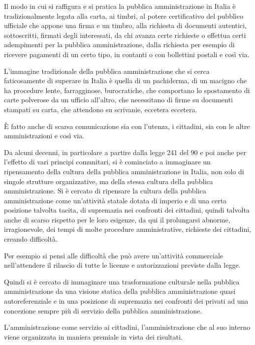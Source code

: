 Il modo in cui si raffigura e si pratica la pubblica amministrazione in Italia è tradizionalmente legata alla carta, ai timbri, al potere certificativo del pubblico ufficiale che appone una firma e un timbro, alla richiesta di documenti autentici, sottoscritti, firmati degli interessati, da chi avanza certe richieste o effettua certi adempimenti per la pubblica amministrazione, dalla richiesta per esempio di ricevere pagamenti di un certo tipo, in contanti o con bollettini postali e così via.\par
L'immagine tradizionale della pubblica amministrazione che si cerca faticosamente di superare in Italia  è quella di un pachiderma, di un macigno che ha procedure lente, farragginose, burocratiche, che comportano lo spostamento di carte polverose da un ufficio all'altro, che necessitano di firme su documenti stampati su carta, che attendono su scrivanie, eccetera eccetera.\par
È fatto anche di scarsa comunicazione sia con l'utenza, i cittadini, sia con le altre amministrazioni e così via.\par
Da alcuni decenni, in particolare a partire dalla legge 241 del 90 e poi anche per l'effetto di vari principi comunitari, si è cominciato a immaginare un ripensamento della cultura della pubblica amministrazione in Italia, non solo di singole strutture organizzative, ma della stessa cultura della pubblica amministrazione. Si è cercato di ripensare la cultura della pubblica amministrazione come un'attività statale dotata di imperio e di una certa posizione talvolta tacita, di supremazia nei confronti dei cittadini, quindi talvolta anche di scarso rispetto per le loro esigenze, da qui il prolungarsi abnorme, irragionevole, dei tempi di molte procedure amministrative, richieste dei cittadini, creando difficoltà.\par
Per esempio si pensi alle difficoltà che può avere un'attività commerciale nell'attendere il rilascio di tutte le licenze e autorizzazioni previste dalla legge.\par
Quindi si è cercato di immaginare una trasformazione culturale nella pubblica amministrazione da una visione statica della pubblica amministrazione quasi autoreferenziale e in una posizione di supremazia nei confronti dei privati ad una concezione sempre più di servizio della pubblica amministrazione.\par
L'amministrazione come servizio ai cittadini, l'amministrazione che al suo interno viene organizzata in maniera premiale in vista dei risultati.\par
